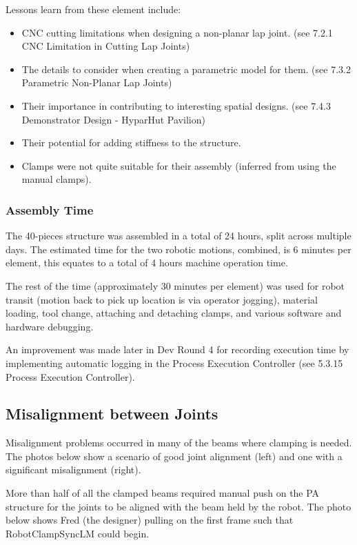\begin{itemize}
\begin{enumerate}
\begin{enumerate}
Lessons learn from these element include:
\begin{itemize}
\item CNC cutting limitations when designing a non-planar lap joint. (see 7.2.1 CNC Limitation in Cutting Lap Joints)
\item The details to consider when creating a parametric model for them. (see 7.3.2 Parametric Non-Planar Lap Joints)
\item Their importance in contributing to interesting spatial designs. (see 7.4.3 Demonstrator Design  - HyparHut Pavilion)
\item Their potential for adding stiffness to the structure.
\item Clamps were not quite suitable for their assembly (inferred from using the manual clamps).
\end{itemize}

\subsubsection{Assembly Time}
The 40-pieces structure was assembled in a total of 24 hours, split across multiple days. The estimated time for the two robotic motions, combined, is 6 minutes per element, this equates to a total of 4 hours machine operation time. 

The rest of the time (approximately 30 minutes per element) was used for robot transit (motion back to pick up location is via operator jogging), material loading, tool change, attaching and detaching clamps, and various software and hardware debugging. 

An improvement was made later in Dev Round 4 for recording execution time by implementing automatic logging in the Process Execution Controller (see 5.3.15 Process Execution Controller). 

\subsection{Misalignment between Joints}
Misalignment problems occurred in many of the beams where clamping is needed. The photos below show a scenario of good joint alignment (left) and one with a significant misalignment (right). 

More than half of all the clamped beams required manual push on the PA structure for the joints to be aligned with the beam held by the robot. The photo below shows Fred (the designer) pulling on the first frame such that RobotClampSyncLM could begin.


\end{enumerate}
\end{enumerate}
\end{itemize}
